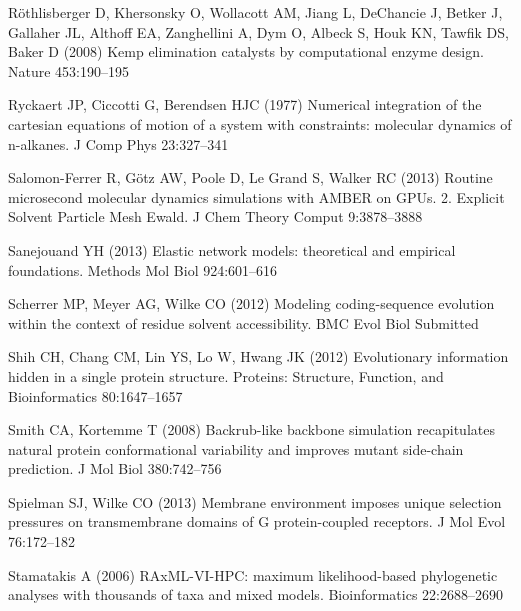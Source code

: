 \documentclass[smallextended]{svjour3}
\begin{document}
\begin{thebibliography}{59}
R\"o{}thlisberger D, Khersonsky O, Wollacott AM, Jiang L, DeChancie J, Betker
  J, Gallaher JL, Althoff EA, Zanghellini A, Dym O, Albeck S, Houk KN, Tawfik
  DS, Baker D (2008) Kemp elimination catalysts by computational enzyme design.
  Nature 453:190--195

Ryckaert JP, Ciccotti G, Berendsen HJC (1977) Numerical integration of the
  cartesian equations of motion of a system with constraints: molecular
  dynamics of n-alkanes. J Comp Phys 23:327--341

Salomon-Ferrer R, G\"otz AW, Poole D, {Le Grand} S, Walker RC (2013) Routine
  microsecond molecular dynamics simulations with {AMBER} on {GPUs.} 2.
  {Explicit Solvent Particle Mesh Ewald}. J Chem Theory Comput 9:3878--3888

Sanejouand YH (2013) Elastic network models: theoretical and empirical
  foundations. Methods Mol Biol 924:601--616

Scherrer MP, Meyer AG, Wilke CO (2012) Modeling coding-sequence evolution
  within the context of residue solvent accessibility. BMC Evol Biol Submitted

Shih CH, Chang CM, Lin YS, Lo W, Hwang JK (2012) Evolutionary information
  hidden in a single protein structure. Proteins: Structure, Function, and
  Bioinformatics 80:1647--1657

Smith CA, Kortemme T (2008) Backrub-like backbone simulation recapitulates
  natural protein conformational variability and improves mutant side-chain
  prediction. J Mol Biol 380:742--756

Spielman SJ, Wilke CO (2013) Membrane environment imposes unique selection
  pressures on transmembrane domains of {G} protein-coupled receptors. J Mol
  Evol 76:172--182

Stamatakis A (2006) {RAxML-VI-HPC:} maximum likelihood-based phylogenetic
  analyses with thousands of taxa and mixed models. Bioinformatics
  22:2688--2690


\end{thebibliography}
\end{document}
